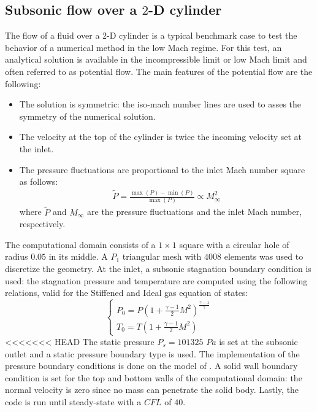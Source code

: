 \documentclass[preprint,10pt]{elsarticle}
\begin{document}
\subsection{Subsonic flow over a $2$-D cylinder} \label{sec:cylinder}
The flow of a fluid over a $2$-D cylinder is a typical benchmark case to test the behavior of a numerical method in the low Mach regime. For this test, an analytical solution is available in the incompressible limit or low Mach limit and often referred to as potential flow. The main features of the potential flow are the following:
\begin{itemize}
\item The solution is symmetric: the iso-mach number lines are used to asses the symmetry of the numerical solution.
\item The velocity at the top of the cylinder is twice the incoming velocity set at the inlet.
\item The pressure fluctuations are proportional to the inlet Mach number square as follows: 
\begin{eqnarray}
\tilde{P} = \frac{\max(P) - \min(P)}{\max(P)}  \propto M_\infty^2\nonumber
\end{eqnarray}
where $\tilde{P}$ and $M_\infty$ are the pressure fluctuations and the inlet Mach number, respectively.
\end{itemize}
The computational domain consists of a $1\times 1$ square with a circular hole of radius $0.05$ in its middle. A $P_1$ triangular mesh with $4008$ elements was used to discretize the geometry. At the inlet, a subsonic stagnation boundary condition is used: the stagnation pressure and temperature are computed using the following relations, valid for the Stiffened and Ideal gas equation of states:
\begin{equation}
\label{eq:stagnation_relations}
\left\{
\begin{array}{l}
P_0 = P\left( 1 + \frac{\gamma-1}{2} M^2 \right)^{\frac{\gamma-1}{\gamma}} \\
T_0 = T\left( 1 + \frac{\gamma-1}{2} M^2 \right)
\end{array}
\right.
\end{equation}
<<<<<<< HEAD
The static pressure $P_s = 101325$ $Pa$ is set at the subsonic outlet and a static pressure boundary type is used. The implementation of the pressure boundary conditions is done on the model of \cite{SEM}. A solid wall boundary condition is set for the top and bottom walls of the computational domain: the normal velocity is zero since no mass can penetrate the solid body. Lastly, the code is run until steady-state with a $CFL$ of $40$.\\
\end{document}
